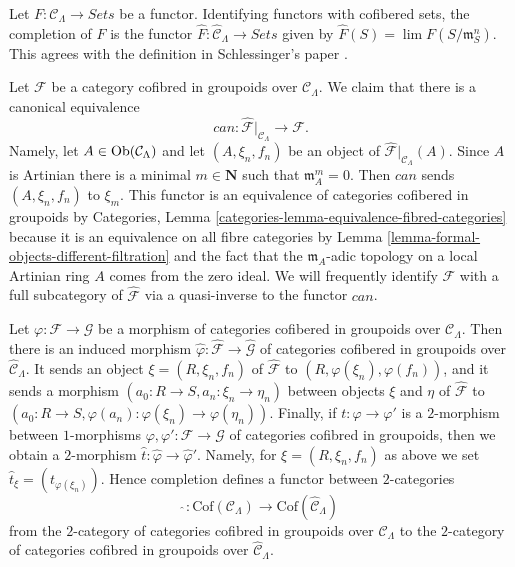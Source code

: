 \begin{remark}
\label{remark-completion-functor}
Let $F: \mathcal{C}_\Lambda \to \textit{Sets}$ be a functor.
Identifying functors with cofibered sets, the completion of $F$ is the functor
$\widehat{F} : \widehat{\mathcal{C}}_\Lambda \to \textit{Sets}$
given by $\widehat{F}(S) = \lim F(S/\mathfrak{m}_S^{n})$.  This agrees
with the definition in Schlessinger's paper \cite{Sch}.
\end{remark}

\begin{remark}
\label{remark-restrict-completion}
Let $\mathcal{F}$ be a category cofibred in groupoids over
$\mathcal{C}_\Lambda$. We claim that there is a canonical
equivalence
$$
can :
\widehat{\mathcal{F}}|_{\mathcal{C}_\Lambda}
\longrightarrow
\mathcal{F}.
$$
Namely, let $A \in \mathop{\mathrm{Ob}}\nolimits(\mathcal{C}_\Lambda)$ and let
$(A, \xi_n, f_n)$ be an object of
$\widehat{\mathcal{F}}|_{\mathcal{C}_\Lambda}(A)$.
Since $A$ is Artinian there is a minimal $m \in \mathbf{N}$
such that $\mathfrak m_A^m = 0$. Then $can$ sends $(A, \xi_n, f_n)$ to $\xi_m$.
This functor is an equivalence of categories cofibered in groupoids by
Categories, Lemma \ref{categories-lemma-equivalence-fibred-categories}
because it is an equivalence on all fibre categories by
Lemma \ref{lemma-formal-objects-different-filtration}
and the fact that the $\mathfrak m_A$-adic topology on a local
Artinian ring $A$ comes from the zero ideal. We will frequently identify
$\mathcal{F}$ with a full subcategory of $\widehat{\mathcal{F}}$ via a
quasi-inverse to the functor $can$.
\end{remark}

\begin{remark}
\label{remark-completion-morphism}
Let $\varphi : \mathcal{F} \to \mathcal{G}$ be a morphism of categories
cofibered in groupoids over $\mathcal{C}_\Lambda$. Then there is an induced
morphism
$\widehat{\varphi}: \widehat{\mathcal{F}} \to \widehat{\mathcal{G}}$
of categories cofibered in groupoids over $\widehat{\mathcal{C}}_\Lambda$.
It sends an object $\xi = (R, \xi_n, f_n)$ of
$\widehat{\mathcal{F}}$ to $(R, \varphi(\xi_n), \varphi(f_n))$, and it sends a
morphism $(a_0 : R \to S, a_n : \xi_n \to \eta_n)$ between
objects $\xi$ and $\eta$ of $\widehat{\mathcal{F}}$ to
$(a_0 : R \to S, \varphi(a_n) : \varphi(\xi_n) \to \varphi(\eta_n))$.
Finally, if $t : \varphi \to \varphi'$ is a $2$-morphism between
$1$-morphisms $\varphi, \varphi': \mathcal{F} \to \mathcal{G}$ of
categories cofibred in groupoids, then we obtain a $2$-morphism
$\widehat{t} : \widehat{\varphi} \to \widehat{\varphi}'$. Namely, for
$\xi = (R, \xi_n, f_n)$ as above we set
$\widehat{t}_\xi = (t_{\varphi(\xi_n)})$. Hence completion defines a
functor between $2$-categories
$$
\widehat{~} :
\text{Cof}(\mathcal{C}_\Lambda)
\longrightarrow
\text{Cof}(\widehat{\mathcal{C}}_\Lambda)
$$
from the $2$-category of categories cofibred in groupoids over
$\mathcal{C}_\Lambda$ to the $2$-category of categories cofibred
in groupoids over $\widehat{\mathcal{C}}_\Lambda$.
\end{remark}

